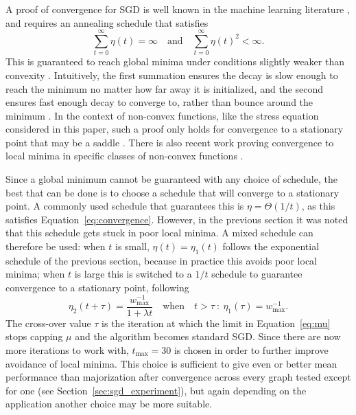 A proof of convergence for SGD is well known in the machine learning literature \cite{Bottou2012}, and requires an annealing schedule that satisfies
\begin{equation}
  \sum_{t=0}^{\infty}\eta(t) = \infty
  \quad \text{and} \quad
  \sum_{t=0}^{\infty}\eta(t)^2 < \infty.
  \label{eq:convergence}
\end{equation}
This is guaranteed to reach global minima under conditions slightly weaker than convexity \cite{Bottou1998}.
Intuitively, the first summation ensures the decay is slow enough to reach the minimum no matter how far away it is initialized, and the second ensures fast enough decay to converge to, rather than bounce around the minimum \cite{Welling2011}.
In the context of non-convex functions, like the stress equation considered in this paper, such a proof only holds for convergence to a stationary point that may be a saddle \cite{Bottou1998}.
There is also recent work proving convergence to local minima in specific classes of non-convex functions \cite{Ge2015}.

Since a global minimum cannot be guaranteed with any choice of schedule, the best that can be done is to choose a schedule that will converge to a stationary point. A commonly used schedule that guarantees this is $\eta=\Theta(1/t)$, as this satisfies Equation~\eqref{eq:convergence}. However, in the previous section it was noted that this schedule gets stuck in poor local minima. A mixed schedule can therefore be used: when $t$ is small, $\eta(t)=\eta_1(t)$ follows the exponential schedule of the previous section, because in practice this avoids poor local minima; when $t$ is large this is switched to a $1/t$ schedule to guarantee convergence to a stationary point, following
\begin{equation}
  \eta_{2}(t + \tau) =
  \frac{w_{\max}^{-1}}{1+\lambda t}
  \quad \text{when}
  \quad t>\tau\: :\:
  \eta_{1}(\tau) = w_{\max}^{-1}.
\end{equation}
The cross-over value $\tau$ is the iteration at which the limit in Equation~\eqref{eq:mu} stops capping $\mu$ and the algorithm becomes standard SGD.
Since there are now more iterations to work with, $t_{\max}=30$ is chosen in order to further improve avoidance of local minima. This choice is sufficient to give even or better mean performance than majorization after convergence across every graph tested except for one (see Section~\ref{sec:sgd_experiment}), but again depending on the application another choice may be more suitable.

